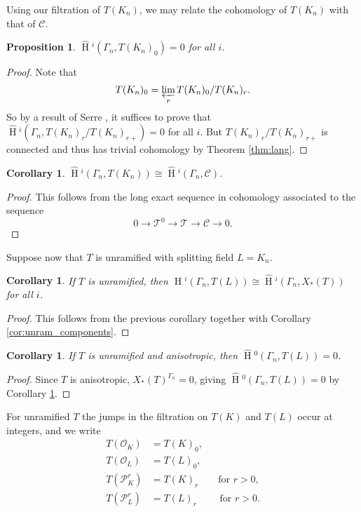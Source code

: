 \documentclass[11pt]{amsart}
\theoremstyle{plain}
\newtheorem{proposition}[theorem]{Proposition}
\newtheorem{corollary}[theorem]{Corollary}
\newcommand{\HT}[1]{\hat{\HH}{}^{#1}}
\theoremstyle{definition}
\DeclareMathOperator{\HH}{H}
\newcommand{\TT}{\mathcal{T}}
\newcommand{\C}{\mathcal{C}}
\newcommand{\OK}{\mathcal{O}_K}
\newcommand{\PK}{\mathcal{P}_K}
\newcommand{\PL}{\mathcal{P}_L}
\newcommand{\OL}{\mathcal{O}_L}
\newcommand{\invlim}[1]{\varprojlim_{#1}}
\begin{document}
Using our filtration of $T(K_n)$, we may relate the cohomology of $T(K_n)$
with that of $\C$.

\begin{proposition}\label{prop:T0_cohom_triv}
$\HT{i}(\Gamma_n, T(K_n)_0) = 0$ for all $i$.
\end{proposition}
\begin{proof}
Note that
$$T(K_n)_0 = \invlim{r} T(K_n)_0 / T(K_n)_r.$$
So by a result of Serre \cite[Lem. 3]{serre:LocalClassFieldThy}, it suffices to prove that
$\HT{i}(\Gamma_n, T(K_n)_r / T(K_n)_{r+}) = 0$ for all $i$.  But $T(K_n)_r / T(K_n)_{r+}$
is connected \cite[Prop. 5.2]{yu:03a} and thus has trivial cohomology by
Theorem \ref{thm:lang}.
\end{proof}

\begin{corollary}
$\HT{i}(\Gamma_n, T(K_n)) \cong \HT{i}(\Gamma_n, \C)$.
\end{corollary}

\begin{proof}
This follows from the long exact sequence in cohomology associated to the sequence
$$0 \rightarrow \TT^0 \rightarrow \TT \rightarrow \C \rightarrow 0.$$
\end{proof}

Suppose now that $T$ is unramified with splitting field $L = K_n$.

\begin{corollary} \label{cor:cohom_tori}
If $T$ is unramified, then $\HT{i}(\Gamma_n, T(L)) \cong \HT{i}(\Gamma_n, X_*(T))$
for all $i$.
\end{corollary}

\begin{proof}
This follows from the previous corollary together with Corollary \ref{cor:unram_components}.
\end{proof}

\begin{corollary}\label{cor:vanishing_H0}
If $T$ is unramified and anisotropic, then $\HT{0}(\Gamma_n, T(L)) = 0$.
\end{corollary}

\begin{proof}
Since $T$ is anisotropic, $X_*(T)^{\Gamma_n} = 0$, giving $\HT{0}(\Gamma_n, T(L)) = 0$ by Corollary
\ref{cor:cohom_tori}.
\end{proof}

For unramified $T$ the jumps in the filtration on $T(K)$ and $T(L)$ occur at integers, and we write
\begin{align*}
T(\OK) &= T(K)_0, \\
T(\OL) &= T(L)_0, \\
T(\PK^r) &= T(K)_r\qquad \mbox{for $r > 0$}, \\
T(\PL^r) &= T(L)_r\qquad\,\,\mbox{for $r > 0$}.
\end{align*}
\end{document}
